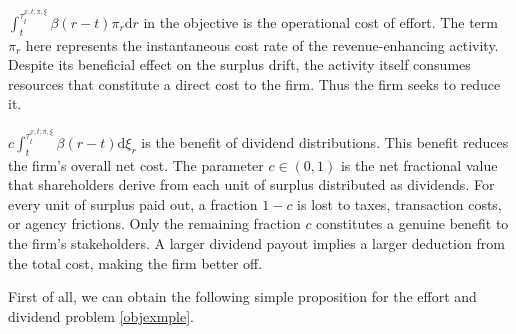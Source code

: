 \documentclass[11pt,reqno]{article}%
\numberwithin{equation}{section}
\begin{document}
$\int_t^{\tau^{x,t;\pi,\xi}_{t}} \beta(r-t)\pi_r\mathrm{d}r $ in the objective is the operational cost of effort. The term $\pi_r$ here represents the instantaneous cost rate of the revenue-enhancing activity. Despite its beneficial effect on the surplus drift, the activity itself consumes resources that constitute a direct cost to the firm. Thus the firm seeks to reduce it.

$c\int_t^{\tau^{x,t;\pi,\xi}_{t}} \beta(r-t)  \mathrm{d} \xi_r$ is the benefit of dividend distributions. This benefit reduces the firm's overall net cost. The parameter $c\in(0,1)$ is the net fractional value that shareholders derive from each unit of surplus distributed as dividends. For every unit of surplus paid out, a fraction $1-c$ is lost to taxes, transaction costs, or agency frictions. Only the remaining fraction $c$ constitutes a genuine benefit to the firm's stakeholders. A larger dividend payout implies a larger deduction from the total cost, making the firm better off.

First of all, we can obtain the following simple proposition for the effort and dividend problem \eqref{objexmple}. 
\end{document}
